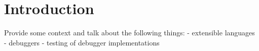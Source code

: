 \section{Introduction}

Provide some context and talk about the following things:
- extensible languages
- debuggers 
- testing of debugger implementations
